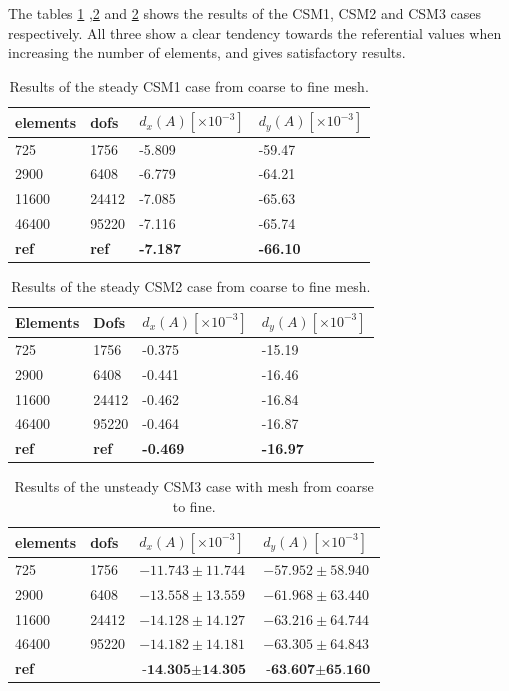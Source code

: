 The tables \ref{tab:CSM1} ,\ref{tab:CSM2} and \ref{tab:CSM2} shows the results of the CSM1, CSM2 and CSM3 cases respectively. All three show a clear tendency towards the referential values when increasing the number of elements, and gives satisfactory results.

\begin{table}[H]
\centering
\caption{Results of the steady CSM1 case from coarse to fine mesh.}
\label{tab:CSM1}
\begin{tabular}{|l|l|l|l|}
\hline
elements & dofs & $d_x(A) [\times10^{-3}]$ & $d_y(A) [\times10^{-3}]$ \\ \hline
725 & 1756 & -5.809 & -59.47 \\ \hline
2900 & 6408 & -6.779 & -64.21 \\ \hline
11600 & 24412 & -7.085 & -65.63 \\ \hline
46400 & 95220 & -7.116 & -65.74 \\ \hline
\textbf{ref} & \textbf{ref} & \textbf{-7.187} &  \textbf{-66.10} \\ \hline
\end{tabular}
\end{table}

\begin{table}[H]
\centering
\caption{Results of the steady CSM2 case from coarse to fine mesh.}
\label{tab:CSM2}
\begin{tabular}{@{}|l|l|l|l|@{}}
\hline
Elements & Dofs & $d_x(A) [\times10^{-3}] $& $d_y(A) [\times10^{-3}] $\\ \hline
725 &  1756 & -0.375 & -15.19 \\ \hline
2900 & 6408 & -0.441 & -16.46\\ \hline
11600 & 24412 & -0.462 & -16.84 \\ \hline
46400 & 95220 & -0.464 & -16.87\\ \hline
\textbf{ref} & \textbf{ref} &  \textbf{-0.469} &  \textbf{-16.97} \\ \hline
\end{tabular}
\end{table}

\begin{table}[H]
\centering
\caption{Results of the unsteady CSM3 case with mesh from coarse to fine.}
\label{tab:CSM3}
\begin{tabular}{|l|l|l|l|}
\hline
elements & dofs & $d_x(A) [\times10^{-3}]$ & $d_y(A)[\times10^{-3}]$ \\ \hline
725 & 1756 & $-11.743 \pm 11.744$ & $-57.952 \pm 58.940$ \\ \hline
2900 & 6408 & $-13.558 \pm 13.559$ & $ -61.968 \pm  63.440 $ \\ \hline
11600 & 24412 & $ -14.128 \pm 14.127$ & $-63.216 \pm 64.744 $ \\ \hline
46400 & 95220 & $ -14.182 \pm 14.181 $ & $ -63.305 \pm 64.843 $ \\ \hline
\textbf{ref} &  & $ \textbf{-14.305} \pm \textbf{14.305} $ & $ \textbf{-63.607} \pm  \textbf{65.160} $ \\ \hline
\end{tabular}
\end{table}

